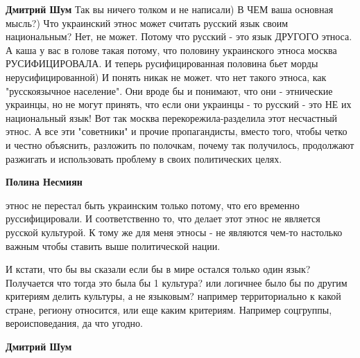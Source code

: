 \begin{itemize}
\begin{itemize}
 
\textbf{Дмитрий Шум} Так вы ничего толком и не написали) В ЧЕМ ваша основная
мысль?) Что украинский этнос может считать русский язык своим национальным?
Нет, не может. Потому что русский - это язык ДРУГОГО этноса. А каша у вас в
голове такая потому, что половину украинского этноса москва РУСИФИЦИРОВАЛА. И
теперь русифицированная половина бьет морды нерусифицированной) И понять никак
не может. что нет такого этноса, как "русскоязычное население". Они вроде бы и
понимают, что они - этнические украинцы, но не могут принять, что если они
украинцы - то русский - это НЕ их национальный язык! Вот так москва
перекорежила-разделила этот несчастный этнос. А все эти "советники" и прочие
пропагандисты, вместо того, чтобы четко и честно объяснить, разложить по
полочкам, почему так получилось, продолжают разжигать и использовать проблему в
своих политических целях.

 
\textbf{Полина Несмиян} 

этнос не перестал быть украинским только потому, что
его временно руссифицировали. И соответственно то, что делает этот этнос не
является русской культурой. К тому же для меня этносы - не являются чем-то
настолько важным чтобы ставить выше политической нации.

И кстати, что бы вы сказали если бы в мире остался только один язык? Получается
что тогда это была бы 1 культура? или логичнее было бы по другим критериям
делить культуры, а не языковым? например территориально к какой стране, региону
относится, или еще каким критериям. Например соцгруппы, вероисповедания, да что
угодно.


 
\textbf{Дмитрий Шум} 


\end{itemize}
\end{itemize}
